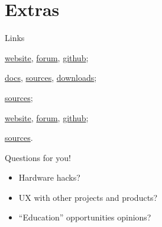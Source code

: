 \documentclass[utf8x,xcolor={usenames,svgnames}]{beamer}
\begin{document}
\section{Extras}

\begin{frame}{Links}
\begin{description}[pymonome]
\item[LIFX] \href{https://www.lifx.com/}{website}, \href{https://community.lifx.com/}{forum}, \href{https://github.com/lifx}{github}; 
\item[lightsd] \href{https://docs.lightsd.io/current/}{docs}, \href{https://github.com/lopter/lightsd/}{sources}, \href{https://downloads.lightsd.io/}{downloads};
\item[monolight] \href{https://github.com/lopter/lightsd/tree/master/apps/monolight}{sources};
\item[monome] \href{http://www.monome.org/}{website}, \href{http://llllllll.co/}{forum}, \href{https://github.com/monome}{github};
\item[pymonome] \href{https://github.com/artfwo/pymonome}{sources}.
\end{description}
\end{frame}

\begin{frame}{Questions for you!}
\begin{itemize}
\item Hardware hacks?
\item UX with other projects and products?
\item ``Education'' opportunities opinions?
\end{itemize}
\end{frame}
\end{document}
